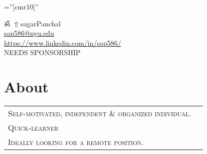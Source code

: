 \documentclass[a4paper]{article}
\newcommand{\apple}{\char"F8FF}
\begin{document}
\pagestyle{empty} 						%
\font\fb=''[cmr10]'' 						%

\par	{\centering
	ॐ
	\href{https://sap586.github.io/LivingSpace/}{$ \Uparrow$}{sagarPanchal}								\\
	\small \href{mailto:sap586@nyu.edu}{sap586@nyu.edu}			
															\\
	\small \href{https://www.linkedin.com/in/sap586/}{https://www.linkedin.com/in/sap586/}				\\
	\small NEEDS SPONSORSHIP																			\par}
	
\section	{	About		}

	\begin{tabular}{lr}
		\textsc{	Self-motivated, independent \& organized individual.									}\\
		\textsc{	Quick-learner																			}\\
		\textsc{	Ideally looking for a remote position.		}
	\end{tabular}
	\begin{spacing}{0.4}
	\end{spacing}

	
%
\end{document}

